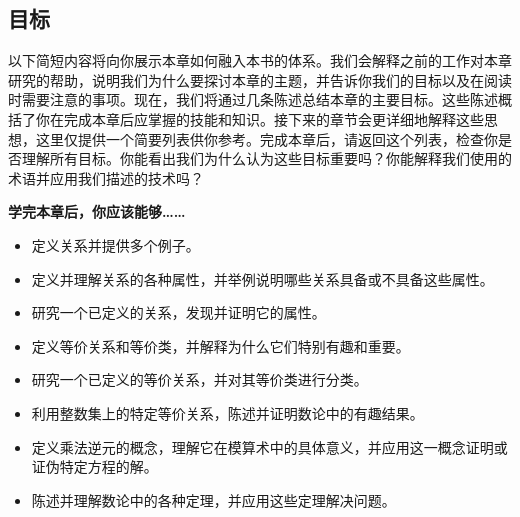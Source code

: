 
\subsection{目标}

以下简短内容将向你展示本章如何融入本书的体系。我们会解释之前的工作对本章研究的帮助，说明我们为什么要探讨本章的主题，并告诉你我们的目标以及在阅读时需要注意的事项。现在，我们将通过几条陈述总结本章的主要目标。这些陈述概括了你在完成本章后应掌握的技能和知识。接下来的章节会更详细地解释这些思想，这里仅提供一个简要列表供你参考。完成本章后，请返回这个列表，检查你是否理解所有目标。你能看出我们为什么认为这些目标重要吗？你能解释我们使用的术语并应用我们描述的技术吗？

\textbf{学完本章后，你应该能够……}

\begin{itemize}
    \item 定义关系并提供多个例子。
    \item 定义并理解关系的各种属性，并举例说明哪些关系具备或不具备这些属性。
    \item 研究一个已定义的关系，发现并证明它的属性。
    \item 定义等价关系和等价类，并解释为什么它们特别有趣和重要。
    \item 研究一个已定义的等价关系，并对其等价类进行分类。
    \item 利用整数集上的特定等价关系，陈述并证明数论中的有趣结果。
    \item 定义乘法逆元的概念，理解它在模算术中的具体意义，并应用这一概念证明或证伪特定方程的解。
    \item 陈述并理解数论中的各种定理，并应用这些定理解决问题。
\end{itemize}